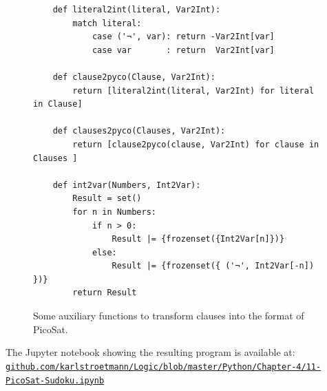 \begin{figure}[!ht]
\centering
\begin{verbatim}
    def literal2int(literal, Var2Int):
        match literal:
            case ('¬', var): return -Var2Int[var]
            case var       : return  Var2Int[var]
    
    def clause2pyco(Clause, Var2Int):
        return [literal2int(literal, Var2Int) for literal in Clause]
    
    def clauses2pyco(Clauses, Var2Int):
        return [clause2pyco(clause, Var2Int) for clause in Clauses ]
    
    def int2var(Numbers, Int2Var):
        Result = set()
        for n in Numbers:
            if n > 0:
                Result |= {frozenset({Int2Var[n]})}
            else: 
                Result |= {frozenset({ ('¬', Int2Var[-n]) })}
        return Result
\end{verbatim}
\vspace*{-0.3cm}
\caption{Some auxiliary functions to transform clauses into the format of PicoSat.}
\label{fig:sudoku-format}
\end{figure}

The Jupyter notebook showing the resulting program is available at:
\\[0.2cm]
\href{https://github.com/karlstroetmann/Logic/blob/master/Python/Chapter-4/11-PicoSat-Sudoku.ipynb}{\small\texttt{github.com/karlstroetmann/Logic/blob/master/Python/Chapter-4/11-PicoSat-Sudoku.ipynb}}

\pagebreak


